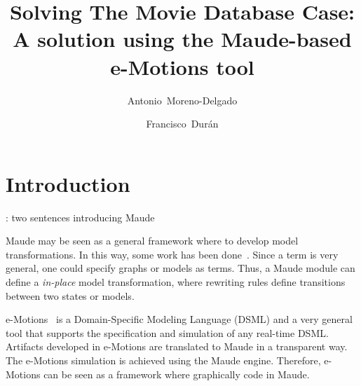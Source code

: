 \documentclass[draft]{llncs}
\newcommand{\todo}[1]{\textbf{\color{red}{TO-DO}}: #1}
\newcommand{\todo}[1]{}
\begin{document}
\pagestyle{headings} %

\title{Solving The Movie Database Case: A solution using the Maude-based e-Motions tool}

\author{Antonio~Moreno-Delgado \and Francisco~Dur\'an}



\maketitle

\begin{abstract}

\end{abstract}

\section{Introduction}\label{sec:intro}

\todo{two sentences introducing Maude}

Maude may be seen as a general framework where to develop model transformations. In this way, some work has been done~\cite{TroyaV10}. Since a term is very general, one could specify graphs or models as terms. Thus, a Maude module can define a \textit{in-place} model transformation, where rewriting rules define transitions between two states or models.

e-Motions~\cite{RiveraDV10} is a Domain-Specific Modeling Language (DSML) and a very general tool that supports the specification and simulation of any real-time DSML. Artifacts developed in e-Motions are translated to Maude in a transparent way. The e-Motions simulation is achieved using the Maude engine. Therefore, e-Motions can be seen as a framework where graphically code in Maude.
\end{document}
